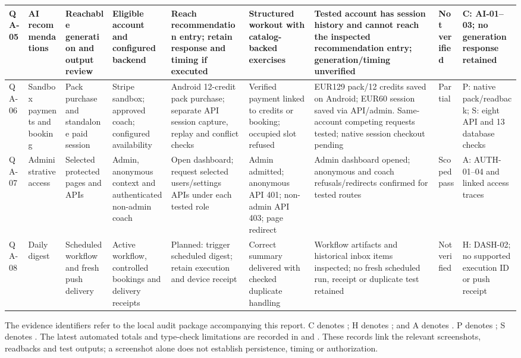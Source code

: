 \documentclass[12pt,a4paper,openany]{report}
\begin{document}
\begin{longtable}{|L{1.20cm}|L{1.50cm}|L{1.60cm}|L{1.60cm}|L{1.80cm}|L{1.80cm}|L{1.65cm}|L{1.35cm}|L{2.00cm}|}
QA-05 & AI recommendations & Reachable generation and output review & Eligible account and configured backend & Reach recommendation entry; retain response and timing if executed & Structured workout with catalog-backed exercises & Tested account has session history and cannot reach the inspected recommendation entry; generation\slash{}timing unverified & Not verified & C: AI-01--03; no generation response retained \\ \hline
QA-06 & Sandbox payments and booking & Pack purchase and standalone paid session & Stripe sandbox; approved coach; configured availability & Android 12-credit pack purchase; separate API session capture, replay and conflict checks & Verified payment linked to credits or booking; occupied slot refused & EUR129 pack\slash{}12 credits saved on Android; EUR60 session saved via API\slash{}admin. Same-account competing requests tested; native session checkout pending & Partial & P: native pack\slash{}readback; S: eight API and 13 database checks \\ \hline
QA-07 & Administrative access & Selected protected pages and APIs & Admin, anonymous context and authenticated non-admin coach & Open dashboard; request selected users\slash{}settings APIs under each tested role & Admin admitted; anonymous API 401; non-admin API 403; page redirect & Admin dashboard opened; anonymous and coach refusals\slash{}redirects confirmed for tested routes & Scoped pass & A: AUTH-01--04 and linked access traces \\ \hline
QA-08 & Daily digest & Scheduled workflow and fresh push delivery & Active workflow, controlled bookings and delivery receipts & Planned: trigger scheduled digest; retain execution and device receipt & Correct summary delivered with checked duplicate handling & Workflow artifacts and historical inbox items inspected; no fresh scheduled run, receipt or duplicate test retained & Not verified & H: DASH-02; no supported execution ID or push receipt \\ \hline
\end{longtable}
\endgroup

The evidence identifiers refer to the local audit package accompanying this report. C denotes ; H denotes ; and A denotes . P denotes ; S denotes . The latest automated totals and type-check limitations are recorded in  and . These records link the relevant screenshots, readbacks and test outputs; a screenshot alone does not establish persistence, timing or authorization.
\end{document}
